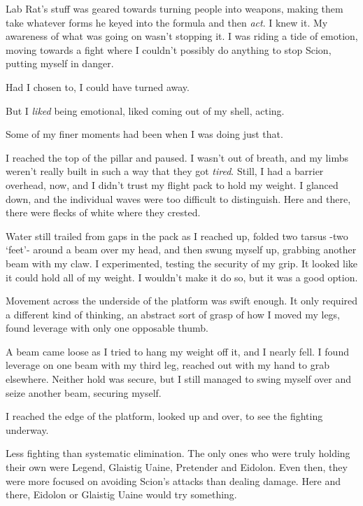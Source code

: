 Lab Rat's stuff was geared towards turning people into weapons, making them take whatever forms he keyed into the formula and then \emph{act}.  I knew it.  My awareness of what was going on wasn't stopping it.  I was riding a tide of emotion, moving towards a fight where I couldn't possibly do anything to stop Scion, putting myself in danger.



Had I chosen to, I could have turned away.



But I \emph{liked} being emotional, liked coming out of my shell, acting.



Some of my finer moments had been when I was doing just that.



I reached the top of the pillar and paused.  I wasn't out of breath, and my limbs weren't really built in such a way that they got \emph{tired}.  Still, I had a barrier overhead, now, and I didn't trust my flight pack to hold my weight.  I glanced down, and the individual waves were too difficult to distinguish.  Here and there, there were flecks of white where they crested.



Water still trailed from gaps in the pack as I reached up, folded two tarsus -two `feet'- around a beam over my head, and then swung myself up, grabbing another beam with my claw.  I experimented, testing the security of my grip.  It looked like it could hold all of my weight.  I wouldn't make it do so, but it was a good option.



Movement across the underside of the platform was swift enough.  It only required a different kind of thinking, an abstract sort of grasp of how I moved my legs, found leverage with only one opposable thumb.



A beam came loose as I tried to hang my weight off it, and I nearly fell.  I found leverage on one beam with my third leg, reached out with my hand to grab elsewhere.  Neither hold was secure, but I still managed to swing myself over and seize another beam, securing myself.



I reached the edge of the platform, looked up and over, to see the fighting underway.



Less fighting than systematic elimination.  The only ones who were truly holding their own were Legend, Glaistig Uaine, Pretender and Eidolon.  Even then, they were more focused on avoiding Scion's attacks than dealing damage.  Here and there, Eidolon or Glaistig Uaine would try something.



